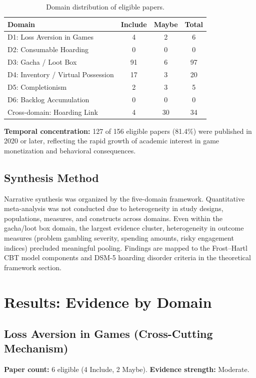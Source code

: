 \documentclass[12pt]{article}
\begin{document}
\begin{table}[ht]
\centering
\caption{Domain distribution of eligible papers.}
\begin{tabular}{lccc}
\toprule
Domain & Include & Maybe & Total \\
\midrule
D1: Loss Aversion in Games & 4 & 2 & 6 \\
D2: Consumable Hoarding & 0 & 0 & 0 \\
D3: Gacha / Loot Box & 91 & 6 & 97 \\
D4: Inventory / Virtual Possession & 17 & 3 & 20 \\
D5: Completionism & 2 & 3 & 5 \\
D6: Backlog Accumulation & 0 & 0 & 0 \\
Cross-domain: Hoarding Link & 4 & 30 & 34 \\
\bottomrule
\end{tabular}
\end{table}

\textbf{Temporal concentration:} 127 of 156 eligible papers (81.4\%) were published in 2020 or later, reflecting the rapid growth of academic interest in game monetization and behavioral consequences.

\subsection{Synthesis Method}

Narrative synthesis was organized by the five-domain framework. Quantitative meta-analysis was not conducted due to heterogeneity in study designs, populations, measures, and constructs across domains. Even within the gacha/loot box domain, the largest evidence cluster, heterogeneity in outcome measures (problem gambling severity, spending amounts, risky engagement indices) precluded meaningful pooling. Findings are mapped to the Frost--Hartl CBT model components and DSM-5 hoarding disorder criteria in the theoretical framework section.

\section{Results: Evidence by Domain}

\subsection{Loss Aversion in Games (Cross-Cutting Mechanism)}

\textbf{Paper count:} 6 eligible (4 Include, 2 Maybe). \textbf{Evidence strength:} Moderate.
\end{document}
